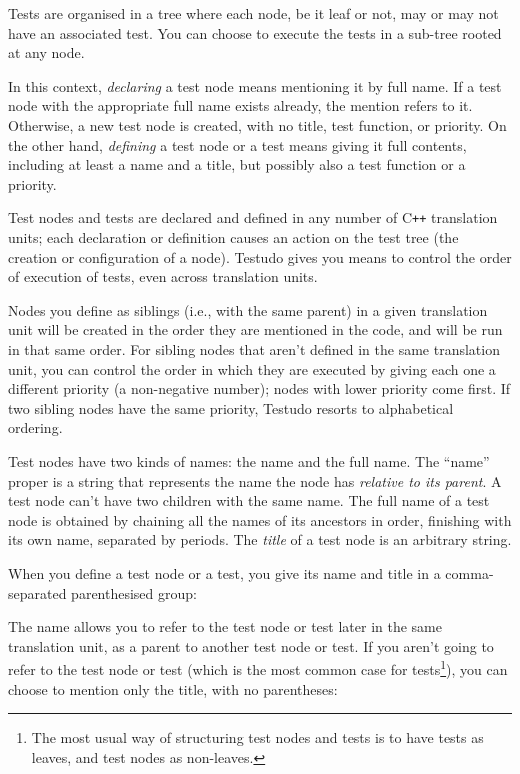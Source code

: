 \documentclass[twoside, a4paper, article]{memoir}
\providecommand\typesetexample[1]{%
}
\newcommand*\Cpp{C\texttt{++}}
\begin{document}
Tests are organised in a tree where each node, be it leaf or not, may or may
not have an associated test.  You can choose to execute the tests in a sub-tree
rooted at any node.

In this context, \emph{declaring} a test node means mentioning it by full name.
If a test node with the appropriate full name exists already, the mention
refers to it.  Otherwise, a new test node is created, with no title, test
function, or priority.  On the other hand, \emph{defining} a test node or a
test means giving it full contents, including at least a name and a title, but
possibly also a test function or a priority.

Test nodes and tests are declared and defined in any number of \Cpp{}
translation units; each declaration or definition causes an action on the test
tree (the creation or configuration of a node).  Testudo gives you means to
control the order of execution of tests, even across translation units.

Nodes you define as siblings (i.e., with the same parent) in a given
translation unit will be created in the order they are mentioned in the code,
and will be run in that same order.  For sibling nodes that aren't defined in
the same translation unit, you can control the order in which they are executed
by giving each one a different priority (a non-negative number); nodes with
lower priority come first.  If two sibling nodes have the same priority,
Testudo resorts to alphabetical ordering.

Test nodes have two kinds of names: the name and the full name.  The ``name''
proper is a string that represents the name the node has \emph{relative to its
  parent}.  A test node can't have two children with the same name.  The full
name of a test node is obtained by chaining all the names of its ancestors in
order, finishing with its own name, separated by periods.  The \emph{title} of
a test node is an arbitrary string.

When you define a test node or a test, you give its name and title in a
comma-separated parenthesised group:

\typesetexample{define-test-node}

The name allows you to refer to the test node or test later in the same
translation unit, as a parent to another test node or test.  If you aren't
going to refer to the test node or test (which is the most common case for
tests\footnote{The most usual way of structuring test nodes and tests is to
  have tests as leaves, and test nodes as non-leaves.}), you can choose to
mention only the title, with no parentheses:
\end{document}
